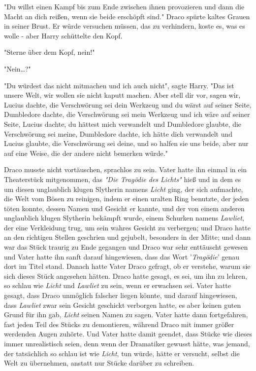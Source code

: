 {"Du willst einen Kampf bis zum Ende zwischen ihnen provozieren und dann die Macht an dich reißen, wenn sie beide erschöpft sind." Draco spürte kaltes Grauen in seiner Brust. Er würde versuchen müssen, das zu verhindern, koste es, was es wolle - aber Harry schüttelte den Kopf.

"Sterne über dem Kopf, nein!"

"Nein…?"

"Du würdest das nicht mitmachen und ich auch nicht", sagte Harry. "Das ist unsere Welt, wir wollen sie nicht kaputt machen. Aber stell dir vor, sagen wir, Lucius dachte, die Verschwörung sei dein Werkzeug und du wärst auf seiner Seite, Dumbledore dachte, die Verschwörung sei mein Werkzeug und ich wäre auf seiner Seite, Lucius dachte, du hättest mich verwandelt und Dumbledore glaubte, die Verschwörung sei meine, Dumbledore dachte, ich hätte dich verwandelt und Lucius glaubte, die Verschwörung sei deine, und so halfen sie uns beide, aber nur auf eine Weise, die der andere nicht bemerken würde."

Draco musste nicht vortäuschen, sprachlos zu sein. Vater hatte ihn einmal in ein Theaterstück mitgenommen, das \emph{"Die Tragödie des Lichts"} hieß und in dem es um diesen unglaublich klugen Slytherin namens \emph{Licht} ging, der sich aufmachte, die Welt vom Bösen zu reinigen, indem er einen uralten Ring benutzte, der jeden töten konnte, dessen Namen und Gesicht er kannte, und der von einem anderen unglaublich klugen Slytherin bekämpft wurde, einem Schurken namens \emph{Lawliet}, der eine Verkleidung trug, um sein wahres Gesicht zu verbergen; und Draco hatte an den richtigen Stellen geschrien und gejubelt, besonders in der Mitte; und dann war das Stück traurig zu Ende gegangen und Draco war sehr enttäuscht gewesen und Vater hatte ihn sanft darauf hingewiesen, dass das Wort '\emph{Tragödie}' genau dort im Titel stand. Danach hatte Vater Draco gefragt, ob er verstehe, warum sie sich dieses Stück angesehen hätten. Draco hatte gesagt, es sei, um ihn zu lehren, so schlau wie \emph{Licht} und \emph{Lawliet} zu sein, wenn er erwachsen sei. Vater hatte gesagt, dass Draco unmöglich falscher liegen könnte, und darauf hingewiesen, dass \emph{Lawliet} zwar sein Gesicht geschickt verborgen hatte, es aber keinen guten Grund für ihn gab, \emph{Licht} seinen Namen zu sagen. Vater hatte dann fortgefahren, fast jeden Teil des Stücks zu demontieren, während Draco mit immer größer werdenden Augen zuhörte. Und Vater hatte damit geendet, dass Stücke wie dieses immer unrealistisch seien, denn wenn der Dramatiker gewusst hätte, was jemand, der tatsächlich so schlau ist wie \emph{Licht}, tun würde, hätte er versucht, selbst die Welt zu übernehmen, anstatt nur Stücke darüber zu schreiben.

}
